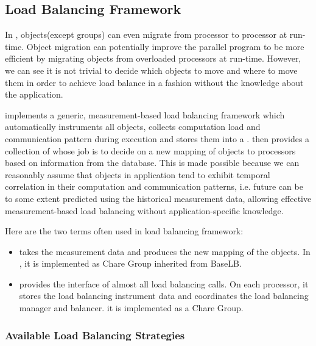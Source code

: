 \subsection{Load Balancing Framework}
\label{lbFramework}

In \charmpp{}, objects(except groups) can even migrate from processor to 
processor at run-time. Object migration can potentially improve the parallel 
program to be more efficient by migrating objects from overloaded processors 
at run-time. However, we can see it is not trivial to decide 
which objects to move and where to move them in order to achieve load
balance in a fashion without the knowledge about the application. 

 \charmpp{} implements a generic, measurement-based load balancing framework 
which automatically instruments all \charmpp{} objects, collects computation 
load and communication pattern during execution and stores them into a 
. \charmpp{} then provides a collection of 
 whose job is to decide on a new mapping of 
objects to processors based on information from the database.
This is made possible because we can reasonably assume that objects 
in \charmpp{} application tend to exhibit temporal correlation in 
their computation and communication patterns, i.e. future can be to some 
extent predicted using the historical measurement data, allowing effective 
measurement-based load balancing without application-specific knowledge. 

Here are the two terms often used in \charmpp{} load balancing framework:
\begin{itemize}
\item {} takes the measurement
   data and produces the new mapping of the objects. In \charmpp{}, it is
   implemented as Chare Group inherited from BaseLB.
\item {} provides the interface of almost all
   load balancing calls. On each processor, it stores the load 
   balancing instrument data and coordinates the load balancing manager and 
   balancer. it is implemented as a Chare Group.
\end{itemize}

\subsubsection{Available Load Balancing Strategies}

